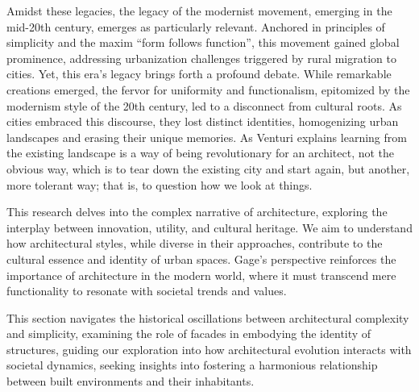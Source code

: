 Amidst these legacies, the legacy of the modernist movement, emerging in the mid-20th century, emerges as particularly relevant.
Anchored in principles of simplicity and the maxim ``form follows function'', this movement gained global prominence, addressing urbanization challenges triggered by rural migration to cities.
Yet, this era's legacy brings forth a profound debate.
While remarkable creations emerged, the fervor for uniformity and functionalism, epitomized by the modernism style of the 20th century, led to a disconnect from cultural roots.
As cities embraced this discourse, they lost distinct identities, homogenizing urban landscapes and erasing their unique memories.
As Venturi\cite{Venturi1972} explains learning from  the existing landscape  is  a  way of being revolutionary for  an  architect, not the obvious way, which is to tear down the existing city and start again, but another, more tolerant way;
that is, to question how we look at things.

This research delves into the complex narrative of architecture, exploring the interplay between innovation, utility, and cultural heritage.
We aim to understand how architectural styles, while diverse in their approaches, contribute to the cultural essence and identity of urban spaces.
Gage's\cite{Gage2015} perspective reinforces the importance of architecture in the modern world, where it must transcend mere functionality to resonate with societal trends and values.

This section navigates the historical oscillations between architectural complexity and simplicity, examining the role of facades in embodying the identity of structures, guiding our exploration into how architectural evolution interacts with societal dynamics, seeking insights into fostering a harmonious relationship between built environments and their inhabitants.




